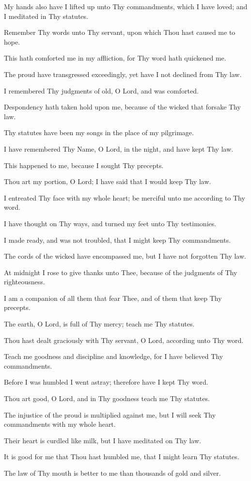 My hands also have I lifted up unto Thy commandments,
which I have loved; and I meditated in Thy statutes.

Remember Thy words unto Thy servant, upon which Thou
hast caused me to hope.

This hath comforted me in my affliction, for Thy word hath
quickened me.

The proud have transgressed exceedingly, yet have I not
declined from Thy law.

I remembered Thy judgments of old, O Lord, and was
comforted.

Despondency hath taken hold upon me, because of the wicked
that forsake Thy law.

Thy statutes have been my songs in the place of my
pilgrimage.

I have remembered Thy Name, O Lord, in the night, and have
kept Thy law.

This happened to me, because I sought Thy precepts.

Thou art my portion, O Lord; I have said that I would keep Thy
law.

I entreated Thy face with my whole heart; be merciful unto me
according to Thy word.

I have thought on Thy ways, and turned my feet unto Thy
testimonies.

I made ready, and was not troubled, that I might keep Thy
commandments.

The cords of the wicked have encompassed me, but I have not
forgotten Thy law.

At midnight I rose to give thanks unto Thee, because of the
judgments of Thy righteousness.

I am a companion of all them that fear Thee, and of them that
keep Thy precepts.

The earth, O Lord, is full of Thy mercy; teach me Thy statutes.

Thou hast dealt graciously with Thy servant, O Lord, according
unto Thy word.

Teach me goodness and discipline and knowledge, for I have
believed Thy commandments.

Before I was humbled I went astray; therefore have I kept Thy
word.

Thou art good, O Lord, and in Thy goodness teach me Thy
statutes.

The injustice of the proud is multiplied against me, but I will
seek Thy commandments with my whole heart.

Their heart is curdled like milk, but I have meditated on Thy
law.

It is good for me that Thou hast humbled me, that I might
learn Thy statutes.

The law of Thy mouth is better to me than thousands of gold
and silver.
